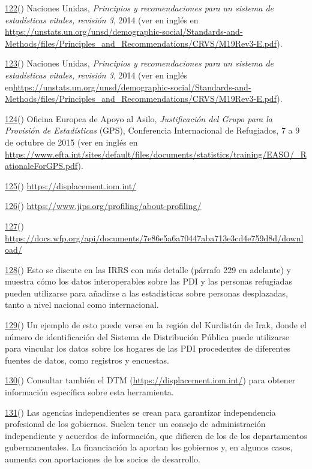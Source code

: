 \documentclass[
]{book}
\begin{document}
\protect\hyperlink{sdfootnote122anc}{122}() Naciones Unidas, \emph{Principios y recomendaciones para un sistema de estadísticas vitales, revisión 3}, 2014 (ver en inglés en \url{https://unstats.un.org/unsd/demographic-social/Standards-and-Methods/files/Principles_and_Recommendations/CRVS/M19Rev3-E.pdf}).

\protect\hyperlink{sdfootnote123anc}{123}() Naciones Unidas, \emph{Principios y recomendaciones para un sistema de estadísticas vitales, revisión 3}, 2014 (ver en inglés en\url{https://unstats.un.org/unsd/demographic-social/Standards-and-Methods/files/Principles_and_Recommendations/CRVS/M19Rev3-E.pdf}).

\protect\hyperlink{sdfootnote124anc}{124}() Oficina Europea de Apoyo al Asilo, \emph{Justificación del Grupo para la Provisión de Estadísticas} (GPS), Conferencia Internacional de Refugiados, 7 a 9 de octubre de 2015 (ver en inglés en \url{https://www.efta.int/sites/default/files/documents/statistics/training/EASO/_RationaleForGPS.pdf}).

\protect\hyperlink{sdfootnote125anc}{125}() \url{https://displacement.iom.int/}

\protect\hyperlink{sdfootnote126anc}{126}() \url{https://www.jips.org/profiling/about-profiling/}

\protect\hyperlink{sdfootnote127anc}{127}() \url{https://docs.wfp.org/api/documents/7e86e5a6a70447aba713e3cd4e759d8d/download/}

\protect\hyperlink{sdfootnote128anc}{128}() Esto se discute en las IRRS con más detalle (párrafo 229 en adelante) y muestra cómo los datos interoperables sobre las PDI y las personas refugiadas pueden utilizarse para añadirse a las estadísticas sobre personas desplazadas, tanto a nivel nacional como internacional.

\protect\hyperlink{sdfootnote129anc}{129}() Un ejemplo de esto puede verse en la región del Kurdistán de Irak, donde el número de identificación del Sistema de Distribución Pública puede utilizarse para vincular los datos sobre los hogares de las PDI procedentes de diferentes fuentes de datos, como registros y encuestas.

\protect\hyperlink{sdfootnote130anc}{130}() Consultar también el DTM (\url{https://displacement.iom.int/}) para obtener información específica sobre esta herramienta.

\protect\hyperlink{sdfootnote131anc}{131}() Las agencias independientes se crean para garantizar independencia profesional de los gobiernos. Suelen tener un consejo de administración independiente y acuerdos de información, que difieren de los de los departamentos gubernamentales. La financiación la aportan los gobiernos y, en algunos casos, aumenta con aportaciones de los socios de desarrollo.
\end{document}

